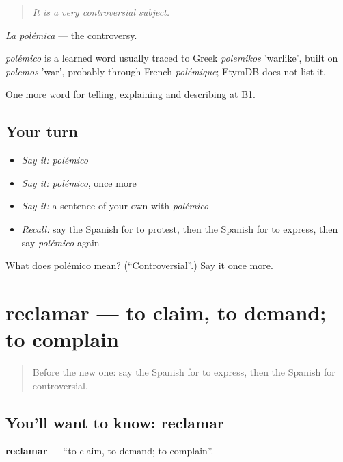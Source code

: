 \begin{quote}
\emph{It is a very controversial subject.}
\end{quote}

\emph{La polémica} — the controversy.

\begin{cousinweb}
\emph{polémico} is a learned word usually traced to Greek \emph{polemikos} 'warlike', built on \emph{polemos} 'war', probably through French \emph{polémique}; EtymDB does not list it.
\end{cousinweb}

\begin{grammarlens}[title={What you've built}]
One more word for telling, explaining and describing at B1.
\end{grammarlens}

\subsection*{Your turn}
\begin{itemize}
\raggedright
  \item \emph{Say it:} \emph{polémico}
  \item \emph{Say it:} \emph{polémico}, once more
  \item \emph{Say it:} a sentence of your own with \emph{polémico}
  \item \emph{Recall:} say the Spanish for to protest, then the Spanish for to express, then say \emph{polémico} again
\end{itemize}

\begin{tcolorbox}[breakable,colback=teal!4,colframe=teal!35!black,title={Before you move on}]
What does polémico mean? (\textquotedblleft{}Controversial\textquotedblright{}.) Say it once more.
\end{tcolorbox}
\section[reclamar]{reclamar — to claim, to demand; to complain}

\label{lesson:ES-C604-reclamar}



\begin{quote}
Before the new one: say the Spanish for to express, then the Spanish for controversial.
\end{quote}

\subsection*{You'll want to know: reclamar}
\textbf{reclamar} — \textquotedblleft{}to claim, to demand; to complain\textquotedblright{}.

